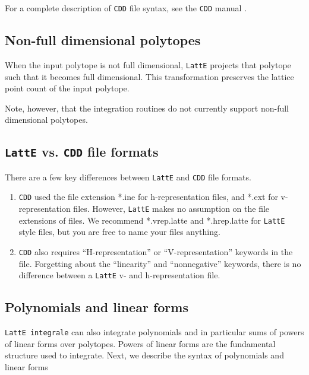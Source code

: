 \documentclass{article}
\newcommand{\latte}{{\tt LattE}\xspace}
\newcommand{\latteInt}{{\tt LattE integrale}\xspace}
\newcommand{\cdd}{{\tt CDD}\xspace}
\begin{document}
For a complete description of \cdd file syntax, see the \cdd manual \cite{fukuda}.

\subsection{Non-full dimensional polytopes}

When the input polytope is not full dimensional, \latte projects that polytope
such that it becomes full dimensional. This transformation preserves the
lattice point count of the input polytope. 

Note, however, that the integration routines do not currently support non-full
dimensional polytopes.

\subsection{\latte vs. \cdd file formats}
There are a few key differences between \latte and \cdd file formats.

\begin{enumerate}
        \item \cdd used the file extension *.ine for h-representation files, and *.ext for v-representation files. However, \latte makes no assumption on the file extensions of files. We recommend *.vrep.latte and *.hrep.latte for \latte style files, but you are free to name your files anything.
        \item \cdd also requires ``H-representation'' or ``V-representation'' keywords in the file. Forgetting about the ``linearity'' and ``nonnegative'' keywords, there is no difference between a \latte v- and h-representation file.
\end{enumerate}


\subsection{Polynomials and linear forms}
\label{input-file:polynomial-and-linear-form}

\latteInt can also integrate polynomials and in particular sums of powers of
linear forms over polytopes. Powers of linear forms are the fundamental structure used to integrate. Next, we describe the syntax of polynomials and linear forms
\end{document}
